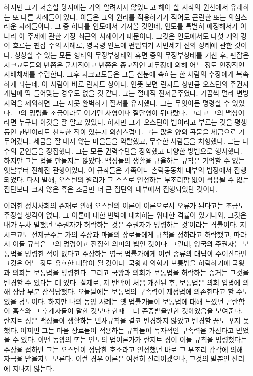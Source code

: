 하지만 
그가 저술할 당시에는 거의 알려지지 않았다고 해야 할 지식의 원천에서 유래하는
또 다른 사례들이 있다.
이들은 그의 원리를 적용하기가 적어도 곤란한 또는 의심스러운 사례들이다.
그 중 하나를 인도에서 가져올 것인데,
인도를 특별히 애정해서가 아니라
이 주제에 관한 가장 최근의 사례이기 때문이다.
그것은 인도에서도
다섯 개의 강이 흐르는
펀잡 주의 사례로,
영국령 인도에 편입되기 사반세기 전의 상태에 관한 것이다.
상상할 수 있는 모든 형태의 무정부상태와 휴면 중의 무정부상태를 거친 후,
펀잡은
시크교도들의
반쯤은 군사적이고 반쯤은 종교적인
과두정에 의해 어느 정도 안정적인 지배체제를 수립한다.
그후 시크교도들은 그들 신분에 속하는 한 사람의 수장에게
복속하게 되는데, 이 사람이 바로 란지트 싱이다.
언뜻 보면 란지트 싱만큼 오스틴의 주권자 개념에
딱 들어맞는 경우도 없을 것 같다.
그는 절대적 전제군주였다.
가끔씩 멀리 변방 지역을 제외하면 그는 자못 완벽하게 질서를 유지했다.
그는 무엇이든 명령할 수 있었다.
그의 명령을 조금이라도 어기면 사형이나 절단형이 뒤따랐다.
그리고 그의 백성이라면 누구나 이것을 잘 알고 있었다.
하지만 그가 오스틴이 법이라고 부르는 것을 평생동안 한번이라도
선포한 적이 있는지 의심스럽다.
그는 많은 양의 곡물을 세금으로 거두어갔다.
세금을 잘 내지 않는 마을들을 약탈했고, 무수한 사람들을 처형했다.
그는 다수의 군인들을 징집했다.
그는 모든 권력수단을 장악했고 다양한 방법으로 행사했다.
하지만 그는 법을 만들지는 않았다.
백성들의 생활을 규율하는 규칙은
기억할 수 없는 옛날부터 전해진 관행이었다.
이 규칙들은 가족이나 촌락공동체 내부의 법정에서 집행되었다.
다시 말해,
오스틴의 원리가 그 스스로 인정하는 부조리함 없이 적용될 수 없는 집단보다
크지 않은 혹은 조금만 더 큰 집단의 내부에서 집행되었던 것이다.

이러한 정치사회의 존재로 인해 오스틴의 이론이 이론으로서 오류가 된다고는
조금도 주장할 생각이 없다.
그 이론에 대한 반박에 대처하는 위대한 격률이 있거니와,
그것은 내가 누차 말했던 `주권자가 허락하는 것은 주권자가 명령하는 것'이라는
격률이다.
저 시크교도 전제군주는 가의 수장과 마을의 장로들에게
규칙을 정하라고 허락했고, 따라서
이들 규칙은 그의 명령이고 진정한 의미의 법인 것이다.
그런데,
영국의 주권자는 보통법을 명령한 적이 없다고 주장하는
영국 법률가에게
이런 종류의 대답이
주어진다면 그것은 어느 정도 유효한 대답이 될 것이다.
국왕과 의회가 보통법을 허락하기에 국왕과 의회는 보통법을 명령한다.
그리고 국왕과 의회가 보통법을 허락하는 증거는 그것을 변경할 수 있다는 데 있다.
실제로, 저 반박이 처음 개진된 후,
보통법은 의회 입법에 의해 상당 부분 잠식당했다.
오늘날에는 보통법의 구속력이 제정법에 의존한다고 할 수도 있을 정도이다.
하지만 나의 동양 사례는
옛 법률가들이 보통법에 대해 느꼈던 곤란함이
홉스와 그 후계자들이 말한 것보다 한때는 더 존중받을만한 것이었음을 보여준다.
란지트 싱은 백성들이 생활하는 민사규칙을 결코 변경하지 않았고
변경할 꿈도 꾸지 못했다.
어쩌면 그는 마을 장로들이 적용하는 규칙들이
독자적인 구속력을 가진다고 믿었을 수 있다.
어떤 동양의 또는 인도의 법이론가가
란지트 싱이 이들 규칙을 명령했다는 주장을 접하면
그는 오스틴이 정당한 호소라고 인정했던 바로 그 부조리 감각에 의해
자극을 받을지도 모른다.
이런 경우 이론은 여전히 진리이겠으나,
그것의 말뿐인 진리에 지나지 않는다.


